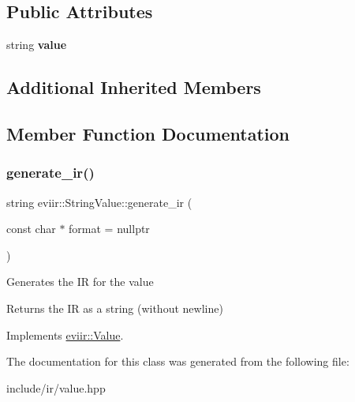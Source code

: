 \subsection*{Public Attributes}
\begin{DoxyCompactItemize}
\item 
\mbox{\label{classeviir_1_1StringValue_a2dc8191eec0dac183451665d080bcafd}} 
string {\bfseries value}
\end{DoxyCompactItemize}
\subsection*{Additional Inherited Members}


\subsection{Member Function Documentation}
\mbox{\label{classeviir_1_1StringValue_ab8c17f9426e993cd01bd67958aba0038}} 
\subsubsection{\texorpdfstring{generate\+\_\+ir()}{generate\_ir()}}
{\footnotesize\ttfamily string eviir\+::\+String\+Value\+::generate\+\_\+ir (\begin{DoxyParamCaption}\item[{const char $\ast$}]{format = {\ttfamily nullptr} }\end{DoxyParamCaption})\hspace{0.3cm}{\ttfamily [virtual]}}

Generates the IR for the value \begin{DoxyReturn}{Returns}
the IR as a string (without newline) 
\end{DoxyReturn}


Implements \hyperlink{classeviir_1_1Value_a0613bf660425df31e230681555f64dea}{eviir\+::\+Value}.



The documentation for this class was generated from the following file\+:\begin{DoxyCompactItemize}
\item 
include/ir/value.\+hpp\end{DoxyCompactItemize}
